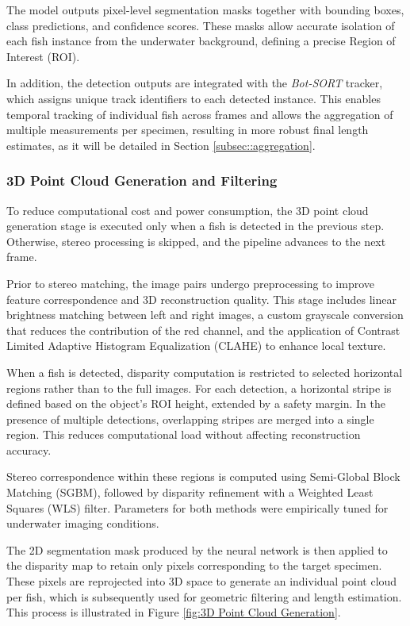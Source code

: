 \documentclass[utf8]{FrontiersinHarvard} %
\begin{document}
The model outputs pixel-level segmentation masks together with bounding boxes, class predictions, and confidence scores. These masks allow accurate isolation of each fish instance from the underwater background, defining a precise Region of Interest (ROI).

In addition, the detection outputs are integrated with the \textit{Bot-SORT} tracker, which assigns unique track identifiers to each detected instance. This enables temporal tracking of individual fish across frames and allows the aggregation of multiple measurements per specimen, resulting in more robust final length estimates, as it will be detailed in Section \ref{subsec::aggregation}.


\subsubsection{3D Point Cloud Generation and Filtering}

To reduce computational cost and power consumption, the 3D point cloud generation stage is executed only when a fish is detected in the previous step. Otherwise, stereo processing is skipped, and the pipeline advances to the next frame.

Prior to stereo matching, the image pairs undergo preprocessing to improve feature correspondence and 3D reconstruction quality. This stage includes linear brightness matching between left and right images, a custom grayscale conversion that reduces the contribution of the red channel, and the application of Contrast Limited Adaptive Histogram Equalization (CLAHE) to enhance local texture.

When a fish is detected, disparity computation is restricted to selected horizontal regions rather than to the full images. For each detection, a horizontal stripe is defined based on the object’s ROI height, extended by a safety margin. In the presence of multiple detections, overlapping stripes are merged into a single region. This reduces computational load without affecting reconstruction accuracy.

Stereo correspondence within these regions is computed using Semi-Global Block Matching (SGBM), followed by disparity refinement with a Weighted Least Squares (WLS) filter. Parameters for both methods were empirically tuned for underwater imaging conditions.

The 2D segmentation mask produced by the neural network is then applied to the disparity map to retain only pixels corresponding to the target specimen. These pixels are reprojected into 3D space to generate an individual point cloud per fish, which is subsequently used for geometric filtering and length estimation. This process is illustrated in Figure \ref{fig:3D Point Cloud Generation}.
\end{document}
